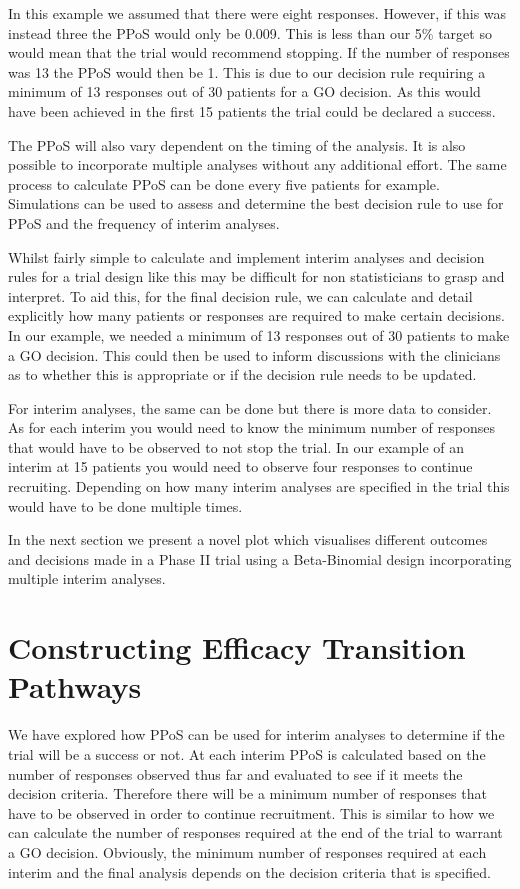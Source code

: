 In this example we assumed that there were eight responses. However, if this was instead three the PPoS would only be 0.009. This is less than our 5\% target so would mean that the trial would recommend stopping. If the number of responses was 13 the PPoS would then be 1. This is due to our decision rule requiring a minimum of 13 responses out of 30 patients for a GO decision. As this would have been achieved in the first 15 patients the trial could be declared a success. 

The PPoS will also vary dependent on the timing of the analysis. It is also possible to incorporate multiple analyses without any additional effort. The same process to calculate PPoS can be done every five patients for example. Simulations can be used to assess and determine the best decision rule to use for PPoS and the frequency of interim analyses. 

Whilst fairly simple to calculate and implement interim analyses and decision rules for a trial design like this may be difficult for non statisticians to grasp and interpret. To aid this, for the final decision rule, we can calculate and detail explicitly how many patients or responses are required to make certain decisions. In our example, we needed a minimum of 13 responses out of 30 patients to make a GO decision. This could then be used to inform discussions with the clinicians as to whether this is appropriate or if the decision rule needs to be updated. 

For interim analyses, the same can be done but there is more data to consider. As for each interim you would need to know the minimum number of responses that would have to be observed to not stop the trial. In our example of an interim at 15 patients you would need to observe four responses to continue recruiting. Depending on how many interim analyses are specified in the trial this would have to be done multiple times.

In the next section we present a novel plot which visualises different outcomes and decisions made in a Phase \RN{2} trial using a Beta-Binomial design incorporating multiple interim analyses.   


\section{Constructing Efficacy Transition Pathways}
We have explored how PPoS can be used for interim analyses to determine if the trial will be a success or not. At each interim PPoS is calculated based on the number of responses observed thus far and evaluated to see if it meets the decision criteria. Therefore there will be a minimum number of responses that have to be observed in order to continue recruitment. This is similar to how we can calculate the number of responses required at the end of the trial to warrant a GO decision. Obviously, the minimum number of responses required at each interim and the final analysis depends on the decision criteria that is specified. 

